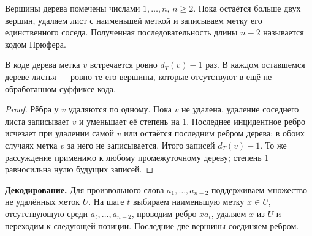 \begin{definition}
Вершины дерева помечены числами \(1,\ldots,n\), \(n\ge2\).
Пока остаётся больше двух вершин, удаляем лист с наименьшей меткой
и записываем метку его единственного соседа. Полученная последовательность
длины \(n-2\) называется кодом Прюфера.
\end{definition}
\begin{lemma}
В коде дерева метка \(v\) встречается ровно \(d_T(v)-1\) раз.
В каждом оставшемся дереве листья — ровно те его вершины,
которые отсутствуют в ещё не обработанном суффиксе кода.
\end{lemma}
\begin{proof}
Рёбра у \(v\) удаляются по одному. Пока \(v\) не удалена,
удаление соседнего листа записывает \(v\) и уменьшает её степень на 1.
Последнее инцидентное ребро исчезает при удалении самой \(v\)
или остаётся последним ребром дерева; в обоих случаях метка \(v\)
за него не записывается. Итого записей \(d_T(v)-1\).
То же рассуждение применимо к любому промежуточному дереву;
степень 1 равносильна нулю будущих записей.
\end{proof}


\textbf{Декодирование.} Для произвольного слова \(a_1,\ldots,a_{n-2}\)
поддерживаем множество не удалённых меток \(U\). На шаге \(t\)
выбираем наименьшую метку \(x\in U\), отсутствующую среди
\(a_t,\ldots,a_{n-2}\), проводим ребро \(xa_t\), удаляем \(x\) из \(U\)
и переходим к следующей позиции. Последние две вершины соединяем ребром.


